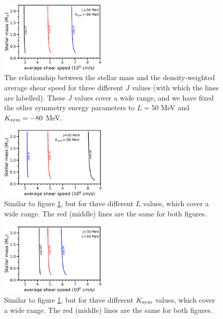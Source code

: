 \documentclass[fleqn,usenatbib]{mnras}
\begin{document}
\begin{figure}
\centering
\includegraphics[width=0.45\textwidth,angle=0]{Mcts_Jvals.png}
\caption{The relationship between the stellar mass and the density-weighted average shear speed for three different $J$ values (with which the lines are labelled). These $J$ values cover a wide range, and we have fixed the other symmetry energy parameters to $L=50$ MeV and $K_{\rm sym}=-80$ MeV.}
\label{fig:Mct_Jvals}
\end{figure}

\begin{figure}
\centering
\includegraphics[width=0.45\textwidth,angle=0]{Mcts_Lvals.png}
\caption{Similar to figure \ref{fig:Mct_Jvals}, but for three different $L$ values, which cover a wide range. The red (middle) lines are the same for both figures.}%
\label{fig:Mct_Lvals}
\end{figure}

\begin{figure}
\centering
\includegraphics[width=0.45\textwidth,angle=0]{Mcts_Kvals.png}
\caption{Similar to figure \ref{fig:Mct_Jvals}, but for three different $K_{\rm sym}$ values, which cover a wide range. The red (middle) lines are the same for both figures.}
\label{fig:Mct_Kvals}
\end{figure}
\end{document}
